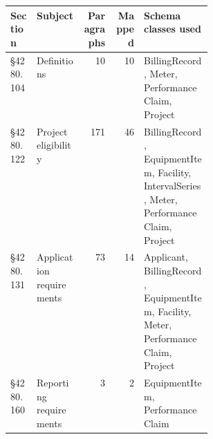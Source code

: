 \begin{tabular}{llrrp{0.34\linewidth}}
\hline
Section & Subject & Paragraphs & Mapped & Schema classes used \\
\hline
\S4280.104 & Definitions & 10 & 10 & BillingRecord, Meter, PerformanceClaim, Project \\
\S4280.122 & Project eligibility & 171 & 46 & BillingRecord, EquipmentItem, Facility, IntervalSeries, Meter, PerformanceClaim, Project \\
\S4280.131 & Application requirements & 73 & 14 & Applicant, BillingRecord, EquipmentItem, Facility, Meter, PerformanceClaim, Project \\
\S4280.160 & Reporting requirements & 3 & 2 & EquipmentItem, PerformanceClaim \\
\hline
\end{tabular}
